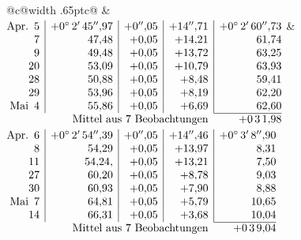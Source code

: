 \noindent\begin{tabular}{@{}c@{\hspace{.4em}\vrule width .65pt\hspace{.4em}}c@{}}
 &
 \\[.18ex]
\(\begin{array}[t]{@{}r|r|r|r|r@{}}
\text{Apr.}\enspace 5 & +0^\circ\,2'\,45''{,}97 & +0''{,}05 & +14''{,}71 & +0^\circ\,2'\,60''{,}73\\
7 & 47{,}48 & +0{,}05 & +14{,}21 & 61{,}74\\
9 & 49{,}48 & +0{,}05 & +13{,}72 & 63{,}25\\
20 & 53{,}09 & +0{,}05 & +10{,}79 & 63{,}93\\
28 & 50{,}88 & +0{,}05 & +8{,}48 & 59{,}41\\
29 & 53{,}96 & +0{,}05 & +8{,}19 & 62{,}20\\
\text{Mai}\enspace 4 & 55{,}86 & +0{,}05 & +6{,}69 & 62{,}60\\
\cline{5-5}
\multicolumn{4}{r}{\text{Mittel aus 7 Beobachtungen}} & +0\,3\,1{,}98
\end{array}\)
&
\(\begin{array}[t]{@{}r|r|r|r|r@{}}
\text{Apr.}\enspace 6 & +0^\circ\,2'\,54''{,}39 & +0''{,}05 & +14''{,}46 & +0^\circ\,3'\,8''{,}90\\
8 & 54{,}29 & +0{,}05 & +13{,}97 & 8{,}31\\
11 & 54{,}24{,} & +0{,}05 & +13{,}21 & 7{,}50\\
27 & 60{,}20 & +0{,}05 & +8{,}78 & 9{,}03\\
30 & 60{,}93 & +0{,}05 & +7{,}90 & 8{,}88\\
\text{Mai}\enspace 7 & 64{,}81 & +0{,}05 & +5{,}79 & 10{,}65\\
14 & 66{,}31 & +0{,}05 & +3{,}68 & 10{,}04\\
\cline{5-5}
\multicolumn{4}{r}{\text{Mittel aus 7 Beobachtungen}} & +0\,3\,9{,}04
\end{array}\)
\end{tabular}\par\medskip
